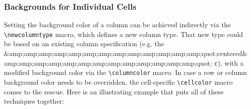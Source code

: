 \subsubsection{Backgrounds for Individual Cells}

Setting the background color of a column can be achieved indirectly via the \verb|\newcolumntype| macro, which defines a new column type. That new type could be based on an existing column specification (e.g. the &amp;amp;amp;amp;amp;amp;amp;amp;amp;amp;amp;amp;amp;quot;centered&amp;amp;amp;amp;amp;amp;amp;amp;amp;amp;amp;amp;amp;quot; \verb|c|), with a modified background color via the \verb|\columncolor| macro. In case a row or column background color needs to be overridden, the cell-specific \verb|\cellcolor| macro comes to the rescue. Here is an illustrating example that puts all of these techniques together:

